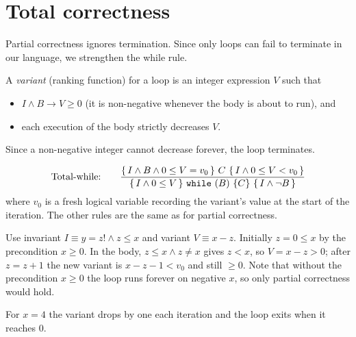 \section{Total correctness}

Partial correctness ignores termination. Since only  loops can fail to
terminate in our language, we strengthen the while rule.

\begin{definition}[Variant]
A \emph{variant} (ranking function) for a loop is an integer expression $V$ such that
\begin{itemize}
  \item $I\land B\to V\ge0$ (it is non-negative whenever the body is about to run), and
  \item each execution of the body strictly decreases $V$.
\end{itemize}
Since a non-negative integer cannot decrease forever, the loop terminates.
\end{definition}

\[
\text{Total-while:}\qquad
\dfrac{\{\,I\land B\land 0\le V=v_0\,\}\ C\ \{\,I\land 0\le V<v_0\,\}}
      {\{\,I\land 0\le V\,\}\ \texttt{while}\ (B)\ \{C\}\ \{\,I\land\neg B\,\}}
\]
where $v_0$ is a fresh logical variable recording the variant's value at the start of
the iteration. The other rules are the same as for partial correctness.

\begin{example}
Use invariant $I\equiv y=z!\land z\le x$ and variant $V\equiv x-z$. Initially $z=0\le x$
by the precondition $x\ge0$. In the body, $z\le x\land z\ne x$ gives $z<x$, so
$V=x-z>0$; after $z=z+1$ the new variant is $x-z-1<v_0$ and still $\ge0$. Note that
without the precondition $x\ge0$ the loop runs forever on negative $x$, so only partial
correctness would hold.
\end{example}
\begin{center}

\small For $x=4$ the variant drops by one each iteration and the loop exits when it reaches $0$.
\end{center}

